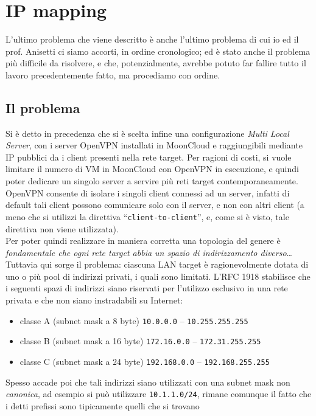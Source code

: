 \section{IP mapping}
L'ultimo problema che viene descritto è anche l'ultimo problema di cui io ed il
prof. Anisetti ci siamo accorti, in ordine cronologico; ed è stato anche il problema
più difficile da risolvere, e che, potenzialmente, avrebbe potuto far fallire
tutto il lavoro precedentemente fatto, ma procediamo con ordine.

\subsection{Il problema}
Si è detto in precedenza che si è scelta infine una configurazione \textit{Multi Local
Server}, con i server OpenVPN installati in MoonCloud e raggiungibili mediante IP
pubblici da i client presenti nella rete target. Per ragioni di costi, si vuole
limitare il numero di VM in MoonCloud con OpenVPN in esecuzione, e quindi poter
dedicare un singolo server a servire più reti target contemporaneamente. OpenVPN
consente di isolare i singoli client connessi ad un server, infatti di default
tali client possono comunicare solo con il server, e non con altri client (a meno
che si utilizzi la direttiva ``\texttt{client-to-client}'', e, come si è visto,
tale direttiva non viene utilizzata).\\
Per poter quindi realizzare in maniera corretta una topologia del genere è
\textit{fondamentale che ogni rete target abbia un spazio di indirizzamento diverso}\ldots
Tuttavia qui sorge il problema: ciascuna LAN target è ragionevolmente dotata
di uno o più pool di indirizzi privati, i quali sono limitati. L'RFC 1918 \cite{RFC1918}
stabilisce che i seguenti spazi di indirizzi siano riservati per l'utilizzo esclusivo
in una rete privata e che non siano instradabili su Internet:
\begin{itemize}
  \item classe A (subnet mask a 8 byte) \texttt{10.0.0.0} -- \texttt{10.255.255.255}
  \item classe B (subnet mask a 16 byte) \texttt{172.16.0.0} -- \texttt{172.31.255.255}
  \item classe C (subnet mask a 24 byte) \texttt{192.168.0.0} -- \texttt{192.168.255.255}
\end{itemize}
Spesso accade poi che tali indirizzi siano utilizzati con una subnet mask non
\textit{canonica}, ad esempio si può utilizzare \texttt{10.1.1.0/24}, rimane
comunque il fatto che i detti prefissi sono tipicamente quelli che si trovano
